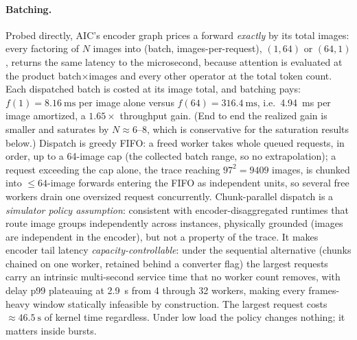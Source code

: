 \paragraph{Batching.} Probed directly, AIC's encoder graph prices a forward
\emph{exactly} by its total images: every factoring of $N$ images into
(batch, images-per-request), $(1,64)$ or $(64,1)$, returns the same
latency to the microsecond, because attention is evaluated at the product
batch$\times$images and every other operator at the total token count. Each
dispatched batch is costed at its image total, and batching pays: $f(1) =
\SI{8.16}{\milli\second}$ per image alone versus
$f(64) = \SI{316.4}{\milli\second}$, i.e.\ \SI{4.94}{\milli\second} per
image amortized, a $1.65\times$ throughput gain. (End to end the realized
gain is smaller and saturates by $N{\approx}6$--$8$, which is conservative
for the saturation results below.) Dispatch is greedy FIFO: a freed worker takes
whole queued requests, in order, up to a 64-image cap (the collected batch
range, so no extrapolation); a request exceeding the cap alone, the trace
reaching $97^2 = \num{9409}$ images, is chunked into $\leq 64$-image
forwards entering the FIFO as independent units, so several free workers
drain one oversized request concurrently. Chunk-parallel dispatch is a
\emph{simulator policy assumption}: consistent with encoder-disaggregated
runtimes that route image groups independently across instances, physically
grounded (images are independent in the encoder), but not a property of the
trace. It makes encoder tail latency \emph{capacity-controllable}: under the
sequential alternative (chunks chained on one worker, retained behind a
converter flag) the largest requests carry an intrinsic multi-second service
time that no worker count removes, with delay p99 plateauing at
\SI{2.9}{\second} from 4 through 32 workers, making every frames-heavy
window statically infeasible by construction. The largest request costs
${\approx}\SI{46.5}{\second}$ of kernel time regardless. Under low load the
policy changes nothing; it matters inside bursts.

